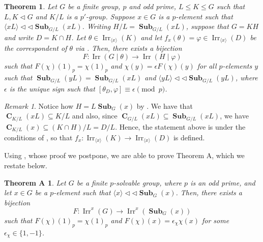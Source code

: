 \documentclass[12pt]{amsart}
\DeclareMathOperator{\CB}{\mathbf{C}}
\DeclareMathOperator{\Sub}{\mathbf{Sub}}
\DeclareMathOperator{\Irr}{Irr}
\theoremstyle{remark}
\newtheorem*{remark}{Remark}
\theoremstyle{definition}
\theoremstyle{plain}
\newtheorem{thm}{Theorem}[section]
\newtheorem*{thmA}{Theorem A}
\theoremstyle{definition}
\numberwithin{equation}{section}
\begin{document}
\begin{thm}
	\label{keyResult}
	Let $G$ be a finite group, $p$ and odd prime, $L \leq K \leq G$ such that $L, K \lhd G$ and $K/L$ is a $p'$-group. Suppose $x \in G$ is a $p$-element such that $\langle xL \rangle {\triangleleft}{\triangleleft} \Sub_{G/L}(xL)$. Writing $H/L = \Sub_{G/L}(xL)$, suppose that $G = KH$ and write $D = K \cap H$. Let $\theta \in \Irr_{\langle x \rangle}(K)$ and let $f_x(\theta) = \varphi \in \Irr_{\langle x \rangle}(D)$ be the correspondent of $\theta$ via . Then, there exists a bijection
	\begin{equation*}
		F: \Irr(G \mid \theta) \to \Irr(H \mid \varphi)
	\end{equation*}
	such that $F(\chi)(1)_p = \chi(1)_p$ and $\chi(y) = \epsilon F(\chi)(y)$ for all $p$-elements $y$ such that $\Sub_{G/L}(yL) = \Sub_{G/L}(xL)$ and $\langle yL \rangle {\triangleleft}{\triangleleft} \Sub_{G/L}(yL)$, where $\epsilon$ is the unique sign such that $[\theta_D, \varphi] \equiv \epsilon \pmod{p}$.
\end{thm}

\begin{remark}
	Notice how $H = L\Sub_{G}(x)$ by . We have that $\CB_{K/L}(xL) \subseteq K/L$ and also, since $\CB_{G/L}(xL) \subseteq \Sub_{G/L}(xL)$, we have $\CB_{K/L}(x) \subseteq (K \cap H)/L = D/L$. Hence, the statement above is under the conditions of , so that $f_x : \Irr_{\langle x \rangle}(K) \to \Irr_{\langle x \rangle}(D)$ is defined.
\end{remark}

Using , whose proof we postpone, we are able to prove Theorem A, which we restate below.

\begin{thmA}
	Let $G$ be a finite $p$-solvable group, where $p$ is an odd prime, and let $x \in G$ be a $p$-element such that $\langle x \rangle {\triangleleft}{\triangleleft} \Sub_G(x)$. Then, there exists a bijection
	\begin{equation*}
		F: \Irr^x(G) \to \Irr^x(\Sub_G(x))
	\end{equation*}
	such that $F(\chi)(1)_p = \chi(1)_p$ and $F(\chi)(x) = \epsilon_\chi \chi(x)$ for some $\epsilon_\chi \in \{1, -1\}$.
\end{thmA}
\end{document}
